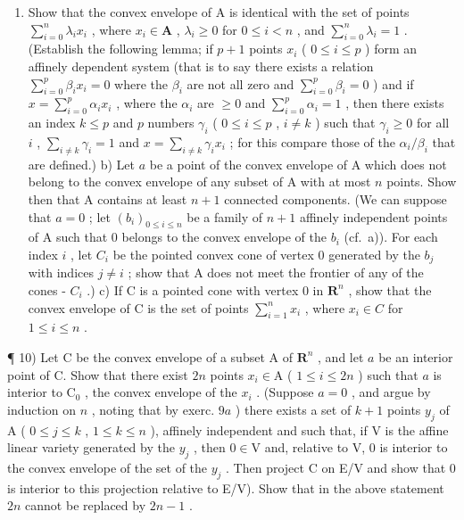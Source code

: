 \begin{enumerate}
\def\labelenumi{\alph{enumi})}
\tightlist
\item
  Show that the convex envelope of A is identical with the set of points \(\sum_{i=0}^{n} \lambda_i x_i\) , where \(x_i \in \mathbf{A}\) , \(\lambda_i \geqslant 0\) for \(0 \leqslant i < n\) , and \(\sum_{i=0}^{n} \lambda_i = 1\) . (Establish the following lemma; if \(p + 1\) points \(x_i\) ( \(0 \leqslant i \leqslant p\) ) form an affinely dependent system (that is to say there exists a relation \(\sum_{i=0}^{p} \beta_i x_i = 0\) where the \(\beta_i\) are not all zero and \(\sum_{i=0}^{p} \beta_i = 0\) ) and if \(x = \sum_{i=0}^{p} \alpha_i x_i\) , where the \(\alpha_i\) are \(\geqslant 0\) and \(\sum_{i=0}^{p} \alpha_i = 1\) , then there exists an index \(k \leqslant p\) and \(p\) numbers \(\gamma_i\) ( \(0 \leqslant i \leqslant p\) , \(i \neq k\) ) such that \(\gamma_i \geqslant 0\) for all \(i\) , \(\sum_{i \neq k} \gamma_i = 1\) and \(x = \sum_{i \neq k} \gamma_i x_i\) ; for this compare those of the \(\alpha_i / \beta_i\) that are defined.) b) Let \(a\) be a point of the convex envelope of A which does not belong to the convex envelope of any subset of A with at most \(n\) points. Show then that A contains at least \(n + 1\) connected components. (We can suppose that \(a = 0\) ; let \((b_i)_{0 \leqslant i \leqslant n}\) be a family of \(n + 1\) affinely independent points of A such that 0 belongs to the convex envelope of the \(b_i\) (cf.~a)). For each index \(i\) , let \(C_i\) be the pointed convex cone of vertex 0 generated by the \(b_j\) with indices \(j \neq i\) ; show that A does not meet the frontier of any of the cones - \(C_i\) .) c) If C is a pointed cone with vertex 0 in \(\mathbf{R}^n\) , show that the convex envelope of C is the set of points \(\sum_{i=1}^{n} x_i\) , where \(x_i \in C\) for \(1 \leqslant i \leqslant n\) .
\end{enumerate}

¶ 10) Let C be the convex envelope of a subset A of \(\mathbf{R}^n\) , and let \(a\) be an interior point of C. Show that there exist \(2n\) points \(x_i \in \mathrm{A}\) ( \(1 \leqslant i \leqslant 2n\) ) such that \(a\) is interior to \(\mathrm{C}_0\) , the convex envelope of the \(x_i\) . (Suppose \(a = 0\) , and argue by induction on \(n\) , noting that by exerc. \(9a\) ) there exists a set of \(k + 1\) points \(y_j\) of A ( \(0 \leqslant j \leqslant k\) , \(1 \leqslant k \leqslant n\) ), affinely independent and such that, if V is the affine linear variety generated by the \(y_j\) , then \(0 \in \mathrm{V}\) and, relative to V, 0 is interior to the convex envelope of the set of the \(y_j\) . Then project C on E/V and show that 0 is interior to this projection relative to E/V). Show that in the above statement \(2n\) cannot be replaced by \(2n - 1\) .

